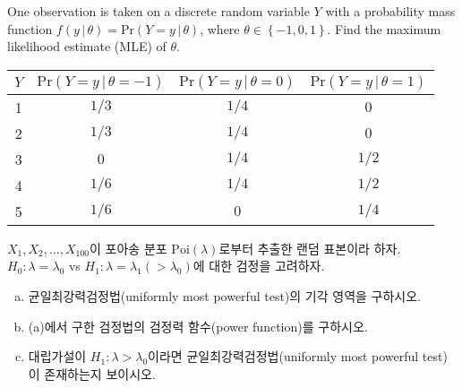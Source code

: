 \documentclass[answers]{exam}
\begin{document}
\begin{questions}
\begin{solution}
   \end{solution}
   \question
   One observation is taken on a discrete random variable $Y$ with a probability mass function $f\left(y\,|\,\theta\right) = \mathrm{Pr}\left(Y=y\,|\,\theta\right)$, where $\theta\in\left\{-1,0,1\right\}$. Find the maximum likelihood estimate (MLE) of $\theta$.
   \begin{table}[!htbp]
    \centering
      \begin{tabular}{*4c}
        \toprule
        $Y$ & $\mathrm{Pr}\left(Y=y\,|\,\theta=-1\right)$ & $\mathrm{Pr}\left(Y=y\,|\,\theta=0\right)$ & $\mathrm{Pr}\left(Y=y\,|\,\theta=1\right)$\\
        \toprule
        1 & $1/3$ & $1/4$ & $0$ \\
        \midrule
        2 & $1/3$ & $1/4$ & $0$ \\
        \midrule
        3 & $0$ & $1/4$ & $1/2$ \\
        \midrule
        4 & $1/6$ & $1/4$ & $1/2$ \\
        \midrule
        5 & $1/6$ & $0$ & $1/4$\\ 
        \bottomrule
      \end{tabular}
    \end{table}
    \begin{solution}

    \end{solution}
    \question
    $X_{1},X_{2},\ldots,X_{100}$이 포아송 분포 $\mathrm{Poi}\left(\lambda\right)$로부터 추출한 랜덤 표본이라 하자. $H_{0}:\lambda=\lambda_{0}$ vs $H_{1}:\lambda=\lambda_{1}(>\lambda_{0})$에 대한 검정을 고려하자.
    \begin{enumerate}[(a)]
      \item 균일최강력검정법(uniformly most powerful test)의 기각 영역을 구하시오.
      \item (a)에서 구한 검정법의 검정력 함수(power function)를 구하시오.
      \item 대립가설이 $H_{1}:\lambda>\lambda_{0}$이라면 균일최강력검정법(uniformly most powerful test)이 존재하는지 보이시오.
    \end{enumerate}
    \begin{solution}


\end{solution}
\end{questions}
\end{document}
